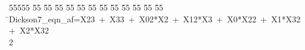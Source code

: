 %
%
\begin{tabbing}
55555 \= 55 \= 55 \= 55 \= 55 \= 55 \= 55 \= 55 \= 55 \= 55 \= 55 \= 55 \= 55 \= \>Dickson7\_eqn\_af=X23\ +\ X33\ +\ X02*X2\ +\ X12*X3\ +\ X0*X22\ +\ X1*X32\ +\ X2*X32\\[0pt]
2\>\end{tabbing}
